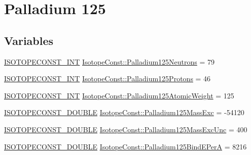 \hypertarget{group___isotope_const-_palladium-_pd125}{}\section{Palladium 125}
\label{group___isotope_const-_palladium-_pd125}
\subsection*{Variables}
\begin{DoxyCompactItemize}
\item 
\mbox{\hyperlink{group___isotope_const-_macros_ga5f18360b3e99483a35c32d789e62621c}{I\+S\+O\+T\+O\+P\+E\+C\+O\+N\+S\+T\+\_\+\+I\+NT}} \mbox{\hyperlink{group___isotope_const-_palladium-_pd125_gacb1f550b1c465b6d1ba16d886d1ad7a7}{Isotope\+Const\+::\+Palladium125\+Neutrons}} = 79
\item 
\mbox{\hyperlink{group___isotope_const-_macros_ga5f18360b3e99483a35c32d789e62621c}{I\+S\+O\+T\+O\+P\+E\+C\+O\+N\+S\+T\+\_\+\+I\+NT}} \mbox{\hyperlink{group___isotope_const-_palladium-_pd125_ga6512b73574efebc86f178753179361d2}{Isotope\+Const\+::\+Palladium125\+Protons}} = 46
\item 
\mbox{\hyperlink{group___isotope_const-_macros_ga5f18360b3e99483a35c32d789e62621c}{I\+S\+O\+T\+O\+P\+E\+C\+O\+N\+S\+T\+\_\+\+I\+NT}} \mbox{\hyperlink{group___isotope_const-_palladium-_pd125_ga67b3a738df5dddc17d3b298956b3c81e}{Isotope\+Const\+::\+Palladium125\+Atomic\+Weight}} = 125
\item 
\mbox{\hyperlink{group___isotope_const-_macros_ga8f45a7272ce02c0b4c65c44636ed719a}{I\+S\+O\+T\+O\+P\+E\+C\+O\+N\+S\+T\+\_\+\+D\+O\+U\+B\+LE}} \mbox{\hyperlink{group___isotope_const-_palladium-_pd125_ga08347cc113682560874c13b692bc92bf}{Isotope\+Const\+::\+Palladium125\+Mass\+Exc}} = -\/54120
\item 
\mbox{\hyperlink{group___isotope_const-_macros_ga8f45a7272ce02c0b4c65c44636ed719a}{I\+S\+O\+T\+O\+P\+E\+C\+O\+N\+S\+T\+\_\+\+D\+O\+U\+B\+LE}} \mbox{\hyperlink{group___isotope_const-_palladium-_pd125_ga26c4335b11147a340ed07f5768f9f564}{Isotope\+Const\+::\+Palladium125\+Mass\+Exc\+Unc}} = 400
\item 
\mbox{\hyperlink{group___isotope_const-_macros_ga8f45a7272ce02c0b4c65c44636ed719a}{I\+S\+O\+T\+O\+P\+E\+C\+O\+N\+S\+T\+\_\+\+D\+O\+U\+B\+LE}} \mbox{\hyperlink{group___isotope_const-_palladium-_pd125_ga8ec6737f067aa413d32d4557ff9b278f}{Isotope\+Const\+::\+Palladium125\+Bind\+E\+PerA}} = 8216
\item 

\end{DoxyCompactItemize}

